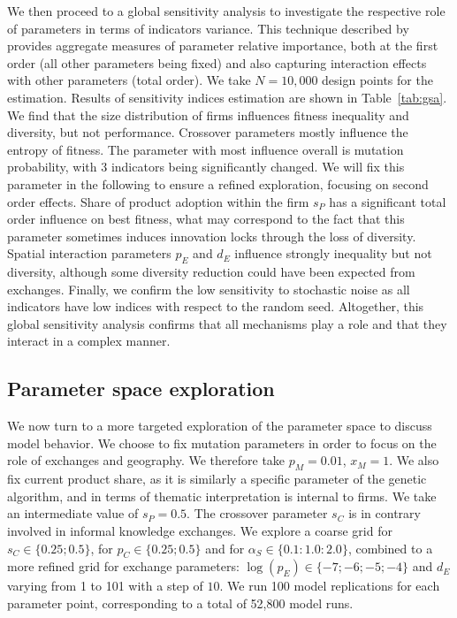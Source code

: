 \documentclass[letterpaper]{article}
\begin{document}
We then proceed to a global sensitivity analysis to investigate the respective role of parameters in terms of indicators variance. This technique described by \cite{saltelli2008global} provides aggregate measures of parameter relative importance, both at the first order (all other parameters being fixed) and also capturing interaction effects with other parameters (total order). We take $N = 10,000$ design points for the estimation. Results of sensitivity indices estimation are shown in Table~\ref{tab:gsa}. We find that the size distribution of firms influences fitness inequality and diversity, but not performance. Crossover parameters mostly influence the entropy of fitness. The parameter with most influence overall is mutation probability, with 3 indicators being significantly changed. We will fix this parameter in the following to ensure a refined exploration, focusing on second order effects. Share of product adoption within the firm $s_P$ has a significant total order influence on best fitness, what may correspond to the fact that this parameter sometimes induces innovation locks through the loss of diversity. Spatial interaction parameters $p_E$ and $d_E$ influence strongly inequality but not diversity, although some diversity reduction could have been expected from exchanges. Finally, we confirm the low sensitivity to stochastic noise as all indicators have low indices with respect to the random seed. Altogether, this global sensitivity analysis confirms that all mechanisms play a role and that they interact in a complex manner.




\subsection{Parameter space exploration}





We now turn to a more targeted exploration of the parameter space to discuss model behavior. We choose to fix mutation parameters in order to focus on the role of exchanges and geography. We therefore take $p_M = 0.01$, $x_M = 1$. We also fix current product share, as it is similarly a specific parameter of the genetic algorithm, and in terms of thematic interpretation is internal to firms. We take an intermediate value of $s_P = 0.5$. The crossover parameter $s_C$ is in contrary involved in informal knowledge exchanges. We explore a coarse grid for $s_C \in \{0.25 ; 0.5\}$, for $p_C \in \{0.25 ; 0.5\}$ and for $\alpha_S \in \{0.1 : 1.0 : 2.0\}$, combined to a more refined grid for exchange parameters: $\log (p_E) \in \{-7 ; -6 ; -5 ; -4\}$ and $d_E$ varying from 1 to 101 with a step of $10$. We run 100 model replications for each parameter point, corresponding to a total of 52,800 model runs.
\end{document}
